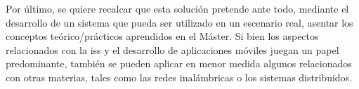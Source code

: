     Por último, se quiere recalcar que esta solución pretende ante todo, mediante el desarrollo de un sistema que pueda ser utilizado en un escenario real, asentar los conceptos teórico/prácticos aprendidos en el Máster. Si bien los aspectos relacionados con la \gls{iss} y el desarrollo de aplicaciones móviles juegan un papel predominante, también se pueden aplicar en menor medida algunos relacionados con otras materias, tales como las redes inalámbricas o los sistemas distribuidos.